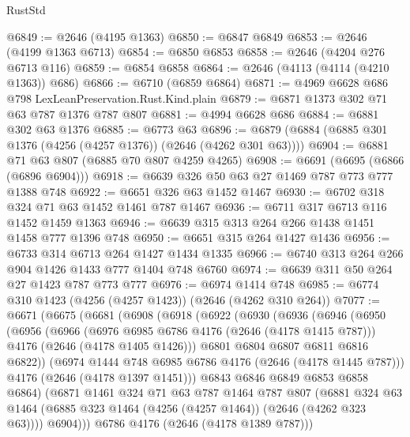 \begin{lexlean}{RustStd}
\begin{coremodule}
@6849 := @2646 (@4195 @1363)
@6850 := @6847 @6849
@6853 := @2646 (@4199 @1363 @6713)
@6854 := @6850 @6853
@6858 := @2646 (@4204 @276 @6713 @116)
@6859 := @6854 @6858
@6864 := @2646 (@4113 (@4114 (@4210 @1363)) @686)
@6866 := @6710 (@6859 @6864)
@6871 := @4969 @6628 @686 @798 LexLeanPreservation.Rust.Kind.plain
@6879 := @6871 @1373 @302 @71 @63 @787 @1376 @787 @807
@6881 := @4994 @6628 @686
@6884 := @6881 @302 @63 @1376
@6885 := @6773 @63
@6896 := @6879 (@6884 (@6885 @301 @1376 (@4256 (@4257 @1376)) (@2646 (@4262 @301 @63))))
@6904 := @6881 @71 @63 @807 (@6885 @70 @807 @4259 @4265)
@6908 := @6691 (@6695 (@6866 (@6896 @6904)))
@6918 := @6639 @326 @50 @63 @27 @1469 @787 @773 @777 @1388 @748
@6922 := @6651 @326 @63 @1452 @1467
@6930 := @6702 @318 @324 @71 @63 @1452 @1461 @787 @1467
@6936 := @6711 @317 @6713 @116 @1452 @1459 @1363
@6946 := @6639 @315 @313 @264 @266 @1438 @1451 @1458 @777 @1396 @748
@6950 := @6651 @315 @264 @1427 @1436
@6956 := @6733 @314 @6713 @264 @1427 @1434 @1335
@6966 := @6740 @313 @264 @266 @904 @1426 @1433 @777 @1404 @748 @6760
@6974 := @6639 @311 @50 @264 @27 @1423 @787 @773 @777
@6976 := @6974 @1414 @748
@6985 := @6774 @310 @1423 (@4256 (@4257 @1423)) (@2646 (@4262 @310 @264))
@7077 := @6671
    (@6675
      (@6681
        (@6908
          (@6918
            (@6922
              (@6930
                (@6936
                  (@6946
                    (@6950
                      (@6956
                        (@6966
                          (@6976 @6985 @6786 @4176 (@2646 (@4178 @1415 @787)))
                          @4176
                          (@2646 (@4178 @1405 @1426)))
                        @6801
                        @6804
                        @6807
                        @6811
                        @6816
                        @6822))
                    (@6974 @1444 @748 @6985 @6786 @4176 (@2646 (@4178 @1445 @787)))
                    @4176
                    (@2646 (@4178 @1397 @1451)))
                  @6843
                  @6846
                  @6849
                  @6853
                  @6858
                  @6864)
                (@6871
                  @1461
                  @324
                  @71
                  @63
                  @787
                  @1464
                  @787
                  @807
                  (@6881
                    @324
                    @63
                    @1464
                    (@6885 @323 @1464 (@4256 (@4257 @1464)) (@2646 (@4262 @323 @63))))
                  @6904)))
            @6786
            @4176
            (@2646 (@4178 @1389 @787)))

\end{coremodule}
\end{lexlean}
